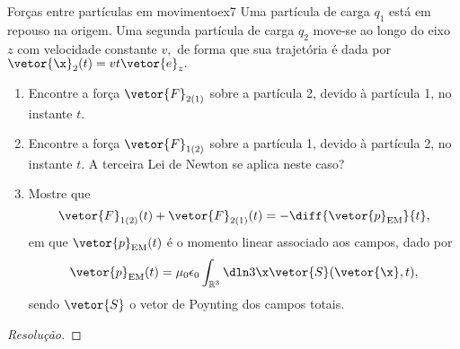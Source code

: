 \begin{exercício}{Forças entre partículas em movimento}{ex7}
   Uma partícula de carga \(q_1\) está em repouso na origem. Uma segunda partícula de carga \(q_2\) move-se ao longo do eixo \(z\) com velocidade constante \(v,\) de forma que sua trajetória é dada por \(\vetor{\x}_2(t) = vt \vetor{e}_z.\)
   \begin{enumerate}[label=(\alph*)]
      \item Encontre a força \(\vetor{F}_{2(1)}\) sobre a partícula 2, devido à partícula 1, no instante \(t\).
      \item Encontre a força \(\vetor{F}_{1(2)}\) sobre a partícula 1, devido à partícula 2, no instante \(t\). A terceira Lei de Newton se aplica neste caso?
      \item Mostre que 
         \begin{equation*}
            \vetor{F}_{1(2)}(t) + \vetor{F}_{2(1)}(t) = -\diff{\vetor{p}_\mathrm{EM}}{t},
         \end{equation*}
         em que \(\vetor{p}_{\mathrm{EM}}(t)\) é o momento linear associado aos campos, dado por
         \begin{equation*}
            \vetor{p}_{\mathrm{EM}}(t) = \mu_0 \epsilon_0 \int_{\mathbb{R}^3} \dln3{\x} \vetor{S}(\vetor{\x}, t),
         \end{equation*}
         sendo \(\vetor{S}\) o vetor de Poynting dos campos totais.
   \end{enumerate}
\end{exercício}
\begin{proof}[Resolução]
    
\end{proof}
